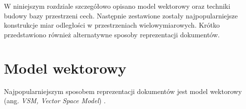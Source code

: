 \documentclass[skorowidz, autorrok, backref, xodstep]{wmimgr}
\newcommand{\eng}[1]{(ang. \emph{#1})}
\begin{document}
W niniejszym rozdziale szczegółowo opisano model wektorowy oraz techniki budowy bazy przestrzeni cech. 
Następnie zestawione zostały najpopularniejsze konstrukcje miar odległości w przestrzeniach wielowymiarowych.
Krótko przedstawiono również alternatywne sposoby reprezentacji dokumentów. 

	\section{Model wektorowy}
	\label{model-wektorowy}
	
Najpopularniejszym sposobem reprezentacji dokumentów jest model wektorowy \eng{VSM, Vector Space Model}
\cite{Broda2007, Manning2009, Kosmulski2005}.
\end{document}
